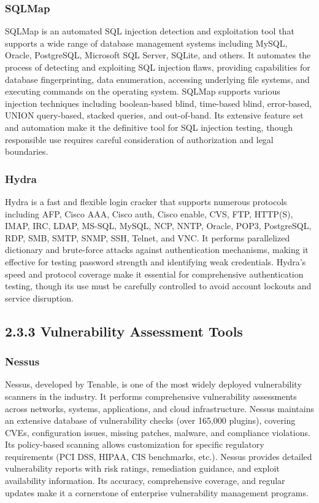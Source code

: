 \documentclass[12pt,a4paper]{report}
\begin{document}
\subsubsection{SQLMap}

SQLMap is an automated SQL injection detection and exploitation tool that supports a wide range of database management systems including MySQL, Oracle, PostgreSQL, Microsoft SQL Server, SQLite, and others. It automates the process of detecting and exploiting SQL injection flaws, providing capabilities for database fingerprinting, data enumeration, accessing underlying file systems, and executing commands on the operating system. SQLMap supports various injection techniques including boolean-based blind, time-based blind, error-based, UNION query-based, stacked queries, and out-of-band. Its extensive feature set and automation make it the definitive tool for SQL injection testing, though responsible use requires careful consideration of authorization and legal boundaries.

\subsubsection{Hydra}

Hydra is a fast and flexible login cracker that supports numerous protocols including AFP, Cisco AAA, Cisco auth, Cisco enable, CVS, FTP, HTTP(S), IMAP, IRC, LDAP, MS-SQL, MySQL, NCP, NNTP, Oracle, POP3, PostgreSQL, RDP, SMB, SMTP, SNMP, SSH, Telnet, and VNC. It performs parallelized dictionary and brute-force attacks against authentication mechanisms, making it effective for testing password strength and identifying weak credentials. Hydra's speed and protocol coverage make it essential for comprehensive authentication testing, though its use must be carefully controlled to avoid account lockouts and service disruption.

\subsection{2.3.3 Vulnerability Assessment Tools}

\subsubsection{Nessus}

Nessus, developed by Tenable, is one of the most widely deployed vulnerability scanners in the industry. It performs comprehensive vulnerability assessments across networks, systems, applications, and cloud infrastructure. Nessus maintains an extensive database of vulnerability checks (over 165,000 plugins), covering CVEs, configuration issues, missing patches, malware, and compliance violations. Its policy-based scanning allows customization for specific regulatory requirements (PCI DSS, HIPAA, CIS benchmarks, etc.). Nessus provides detailed vulnerability reports with risk ratings, remediation guidance, and exploit availability information. Its accuracy, comprehensive coverage, and regular updates make it a cornerstone of enterprise vulnerability management programs.
\end{document}
